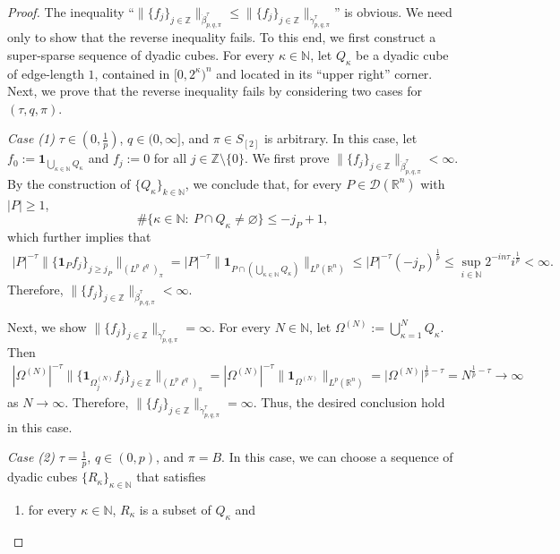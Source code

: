 \documentclass[11pt, reqno]{amsart}
\theoremstyle{definition}
\theoremstyle{remark}
\numberwithin{equation}{section}
\newcommand{\N}{\mathbb N}
\newcommand{\Z}{\mathbb Z}
\newcommand{\one}{\mathbf{1}}
\begin{document}
\begin{proof}
The inequality ``$\|\{f_j\}_{j\in\mathbb Z}\|_{\dot\beta^\tau_{p,q,\pi}}
\leq\|\{f_j\}_{j\in\mathbb Z}\|_{\dot\gamma^\tau_{p,q,\pi}}$'' is obvious.
We need only to show that the reverse inequality fails.
To this end, we first construct a super-sparse sequence of dyadic cubes.
For every $\kappa\in\mathbb N$, let $Q_\kappa$
be a dyadic cube of edge-length $1$, contained in $[0,2^\kappa)^n$
and located in its ``upper right'' corner.
Next, we prove that the reverse inequality fails
by considering two cases for $(\tau,q,\pi)$.

\emph{Case (1)} $\tau\in(0,\frac1p)$, $q\in(0,\infty]$, and $\pi\in S_{[2]}$ is arbitrary.
In this case, let $f_0:=\mathbf 1_{\bigcup_{\kappa\in\mathbb N}Q_\kappa}$
and $f_j:=0$ for all $j\in\mathbb Z\setminus\{0\}$.
We first prove $\|\{f_j\}_{j\in\mathbb Z}\|_{\dot\beta^\tau_{p,q,\pi}}<\infty$.
By the construction of $\{Q_\kappa\}_{k\in\N}$,
we conclude that, for every $P\in\mathscr D(\mathbb R^n)$ with $|P|\geq 1$,
$$
\#\{\kappa\in\mathbb N:\
P\cap Q_\kappa \neq \varnothing \} \leq -j_P+1,
$$
which further implies that
\begin{align*}
|P|^{-\tau} \big\|\{\one_P f_j\}_{j\geq j_P}\big\|_{(L^p\ell^q)_\pi}
=|P|^{-\tau}
\| \mathbf 1_{P\cap(\bigcup_{\kappa\in\mathbb N}Q_\kappa)} \|_{L^p(\mathbb R^n)}
\leq |P|^{-\tau} (-j_P)^{\frac 1p}
\leq \sup_{i\in\mathbb N} 2^{-in\tau}i^{\frac 1p}<\infty.
\end{align*}
Therefore, $\|\{f_j\}_{j\in\mathbb Z}\|_{\dot\beta^\tau_{p,q,\pi}}<\infty$.

Next, we show $\|\{f_j\}_{j\in\mathbb Z}\|_{\dot\gamma^\tau_{p,q,\pi}}=\infty$.
For every $N\in\mathbb N$,
let $\Omega^{(N)}:=\bigcup_{\kappa=1}^N Q_\kappa$.
Then
\begin{align*}
|\Omega^{(N)}|^{-\tau}\Big\|\Big\{\one_{\Omega^{(N)}_j} f_j\Big\}_{j\in\Z}\Big\|_{(L^p\ell^q)_\pi}
=|\Omega^{(N)}|^{-\tau}\big\|\mathbf 1_{\Omega^{(N)}}\big\|_{L^p(\mathbb R^n)}
= \big|\Omega^{(N)}\big|^{\frac1p-\tau}
=N^{\frac1p-\tau}
\to \infty
\end{align*}
as $N\to\infty$.
Therefore, $\|\{f_j\}_{j\in\mathbb Z}\|_{\dot\gamma^\tau_{p,q,\pi}}=\infty$.
Thus, the desired conclusion hold in this case.

\emph{Case (2)} $\tau=\frac1p$, $q\in(0,p)$, and $\pi= B$.
In this case,
we can choose a sequence of dyadic cubes $\{R_\kappa\}_{\kappa\in\mathbb N}$ that satisfies
\begin{enumerate}[\rm(i)]
\item for every $\kappa\in\mathbb N$,
$R_\kappa$ is a subset of $Q_\kappa$ and


\end{enumerate}
\end{proof}
\end{document}
